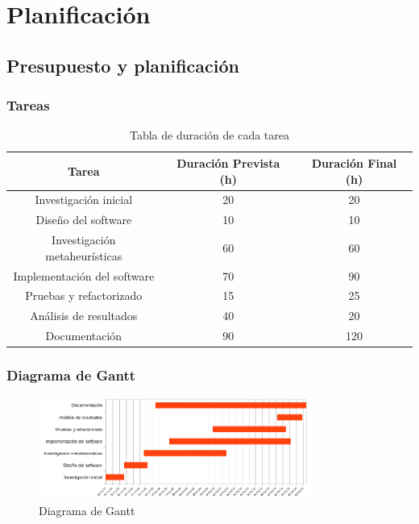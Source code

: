 \section{Planificación}
\subsection{Presupuesto y planificación}

\begin{frame}
    \frametitle{Tareas}
    \begin{table}[htp]
        \centering
        \begin{tabular}{c|c|c}
            Tarea                         & Duración Prevista (h) & Duración Final (h) \\ \hline
            Investigación inicial         & 20                    & 20                 \\
            Diseño del software           & 10                    & 10                 \\
            Investigación metaheurísticas & 60                    & 60                 \\
            Implementación del software   & 70                    & 90                 \\
            Pruebas y refactorizado       & 15                    & 25                 \\
            Análisis de resultados        & 40                    & 20                 \\
            Documentación                 & 90                    & 120                \\ \hline
        \end{tabular}
        \caption{Tabla de duración de cada tarea}
        \label{tab:task_duration}
    \end{table}
\end{frame}

\begin{frame}
    \frametitle{Diagrama de Gantt}
    \begin{figure}
        \centering
        \includegraphics[width=0.8\textwidth]{imagenes/chapter2/gantt-fin.png}
        \caption{Diagrama de Gantt}
    \end{figure}
\end{frame}

